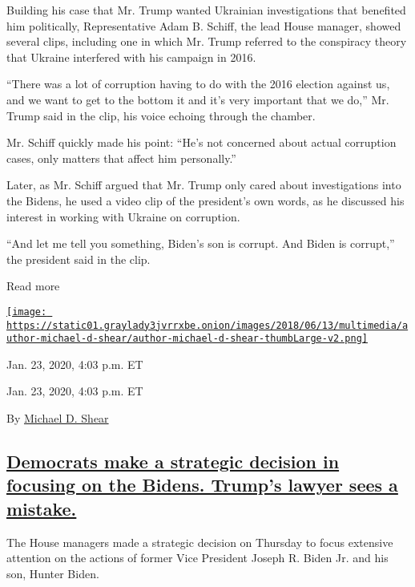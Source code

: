 Building his case that Mr. Trump wanted Ukrainian investigations that
benefited him politically, Representative Adam B. Schiff, the lead House
manager, showed several clips, including one in which Mr. Trump referred
to the conspiracy theory that Ukraine interfered with his campaign in
2016.

``There was a lot of corruption having to do with the 2016 election
against us, and we want to get to the bottom it and it's very important
that we do,'' Mr. Trump said in the clip, his voice echoing through the
chamber.

Mr. Schiff quickly made his point: ``He's not concerned about actual
corruption cases, only matters that affect him personally.''

Later, as Mr. Schiff argued that Mr. Trump only cared about
investigations into the Bidens, he used a video clip of the president's
own words, as he discussed his interest in working with Ukraine on
corruption.

``And let me tell you something, Biden's son is corrupt. And Biden is
corrupt,'' the president said in the clip.

Read more

\href{https://www.nytimes3xbfgragh.onion/by/michael-d-shear}{\texttt{[image: https://static01.graylady3jvrrxbe.onion/images/2018/06/13/multimedia/author-michael-d-shear/author-michael-d-shear-thumbLarge-v2.png]}}

Jan. 23, 2020, 4:03 p.m. ET

Jan. 23, 2020, 4:03 p.m. ET

By \href{https://www.nytimes3xbfgragh.onion/by/michael-d-shear}{Michael
D. Shear}

\hypertarget{democrats-make-a-strategic-decision-in-focusing-on-the-bidens-trumps-lawyer-sees-a-mistake}{%
\subsection{\texorpdfstring{\protect\hyperlink{democrats-make-a-strategic-decision-in-focusing-on-the-bidens-trumps-lawyer-sees-a-mistake}{Democrats
make a strategic decision in focusing on the Bidens. Trump's lawyer sees
a
mistake.}}{Democrats make a strategic decision in focusing on the Bidens. Trump's lawyer sees a mistake.}}\label{democrats-make-a-strategic-decision-in-focusing-on-the-bidens-trumps-lawyer-sees-a-mistake}}

The House managers made a strategic decision on Thursday to focus
extensive attention on the actions of former Vice President Joseph R.
Biden Jr. and his son, Hunter Biden.

